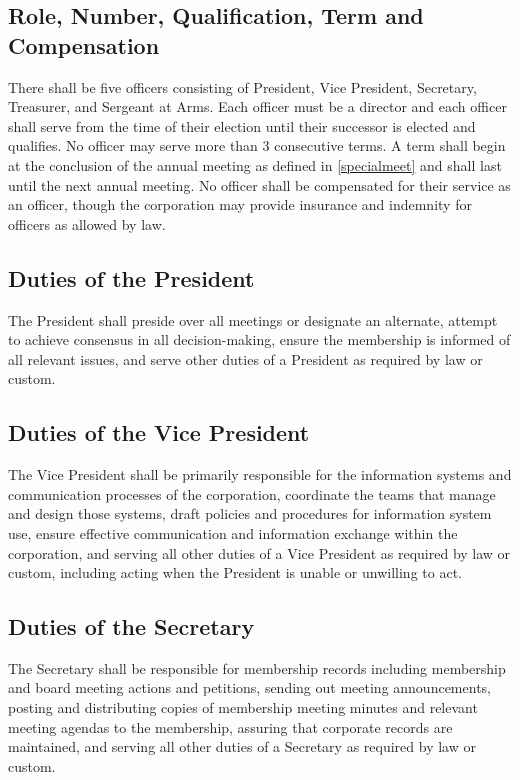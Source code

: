 \documentclass[10pt,letterpaper,titlepage]{article}
\begin{document}
\subsection{Role, Number, Qualification, Term and Compensation}

There shall be five officers consisting of President, Vice President,
Secretary, Treasurer, and Sergeant at Arms.
Each officer must be a director and each officer shall serve from the time of
their election until their successor is elected and qualifies.
No officer may serve more than 3 consecutive terms.
A term shall begin at the conclusion of the annual meeting as defined in
\ref{specialmeet} and shall last until the next annual meeting.
No officer shall be compensated for their service as an officer, though the
corporation may provide insurance and indemnity for officers as allowed by law.

\subsection{Duties of the President}

The President shall preside over all meetings or designate an alternate,
attempt to achieve consensus in all decision-making, ensure the membership is
informed of all relevant issues, and serve other duties of a President as
required by law or custom.

\subsection{Duties of the Vice President}

The Vice President shall be primarily responsible for the information systems
and communication processes of the corporation, coordinate the teams that
manage and design those systems, draft policies and procedures for information
system use, ensure effective communication and information exchange within the
corporation, and serving all other duties of a Vice President as required by
law or custom, including acting when the President is unable or unwilling to
act.

\subsection{Duties of the Secretary}

The Secretary shall be responsible for membership records including membership
and board meeting actions and petitions, sending out meeting announcements,
posting and distributing copies of membership meeting minutes and relevant
meeting agendas to the membership, assuring that corporate records are
maintained, and serving all other duties of a Secretary as required by law or
custom.
\end{document}
